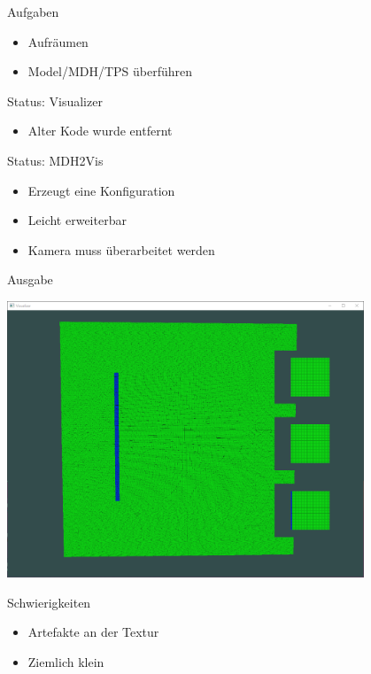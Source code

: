 \documentclass{../presentation}
\begin{document}
\frame[plain]{\titlepage}

\begin{frame}{Aufgaben}
    \begin{itemize}
        \item Aufräumen
        \item Model/MDH/TPS überführen
    \end{itemize}
\end{frame}

\begin{frame}{Status: Visualizer}
    \begin{itemize}
        \item Alter Kode wurde entfernt
    \end{itemize}
\end{frame}

\begin{frame}{Status: MDH2Vis}
    \begin{itemize}
        \item Erzeugt eine Konfiguration
        \item Leicht erweiterbar
        \item Kamera muss überarbeitet werden
    \end{itemize}
\end{frame}

\begin{frame}{Ausgabe}
    \begin{center}
        \includegraphics[width=0.8\textwidth]{visualizer_output.png}
    \end{center}
\end{frame}

\begin{frame}{Schwierigkeiten}
    \begin{itemize}
        \item Artefakte an der Textur
        \item Ziemlich klein
    \end{itemize}
\end{frame}
\end{document}
